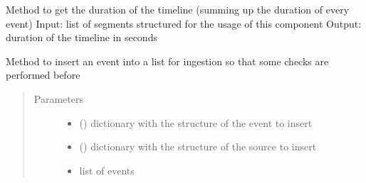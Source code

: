 
\begin{fulllineitems}
\label{\detokenize{eboa.ingestion:eboa.ingestion.functions.get_timeline_duration}}
Method to get the duration of the timeline (summing up the duration of every event)
Input: list of segments structured for the usage of this component
Output: duration of the timeline in seconds

\end{fulllineitems}


\begin{fulllineitems}
\label{\detokenize{eboa.ingestion:eboa.ingestion.functions.insert_event_for_ingestion}}
Method to insert an event into a list for ingestion so that some checks are performed before
\begin{quote}\begin{description}
\item[{Parameters}] \leavevmode\begin{itemize}
\item {} 
 () \textendash{} dictionary with the structure of the event to insert

\item {} 
 () \textendash{} dictionary with the structure of the source to insert

\item {} 
 \textendash{} list of events

\end{itemize}

\end{description}\end{quote}

\end{fulllineitems}

